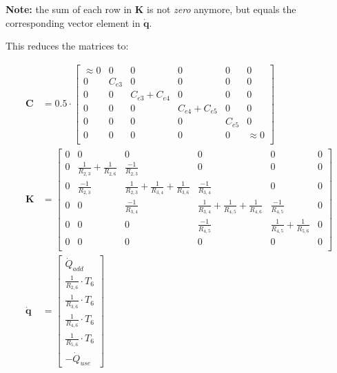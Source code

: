 \textbf{Note:} the sum of each row in $\mathbf{K}$ is not \emph{zero} anymore, but equals the corresponding vector element in $\mathbf{\dot{q}}$.

This reduces the matrices to:

\begin{equation}
	\begin{aligned}
		\mathbf{C} & =
		0.5 \cdot 
		\begin{bmatrix}
			\approx 0 & 0 & 0 & 0 & 0 & 0 \\
			0 & C_{e3} & 0 & 0 & 0 & 0 \\
			0 & 0 & C_{e3} + C_{e4} & 0 & 0 & 0 \\
			0 & 0 & 0 & C_{e4} + C_{e5} & 0 & 0 \\
			0 & 0 & 0 & 0 & C_{e5} & 0 \\
			0 & 0 & 0 & 0 & 0 & \approx 0 \\
		\end{bmatrix} \\
        \mathbf{K} & =
			\begin{bmatrix}
				0 & 0 & 0 & 0 & 0 & 0 \\
				0 & \frac{1}{R_{2,3}} + \frac{1}{R_{2,6}} & \frac{-1}{R_{2,3}} & 0 & 0 & 0 \\
				0 & \frac{-1}{R_{2,3}} & \frac{1}{R_{2,3}} + \frac{1}{R_{3,4}} + \frac{1}{R_{3,6}} & \frac{-1}{R_{3,4}} & 0 & 0 \\
				0 & 0 & \frac{-1}{R_{3,4}} & \frac{1}{R_{3,4}} +  \frac{1}{R_{4,5}} + \frac{1}{R_{4,6}} & \frac{-1}{R_{4,5}} & 0\\
				0 & 0 & 0 & \frac{-1}{R_{4,5}} & \frac{1}{R_{4,5}} + \frac{1}{R_{5,6}} & 0 \\
				0 & 0 & 0 & 0 & 0 & 0\\
		\end{bmatrix} \\
        \mathbf{\dot{q}} & =
	        \begin{bmatrix}
		        \dot{Q}_{add} \\
		        \frac{1}{R_{2,6}} \cdot T_6 \\
		        \frac{1}{R_{3,6}} \cdot T_6 \\
		        \frac{1}{R_{4,6}} \cdot T_6 \\
		        \frac{1}{R_{5,6}} \cdot T_6 \\
		        -\dot{Q}_{use}
	        \end{bmatrix}
	\end{aligned}
	\label{eq:CKq_buffer}
\end{equation}


